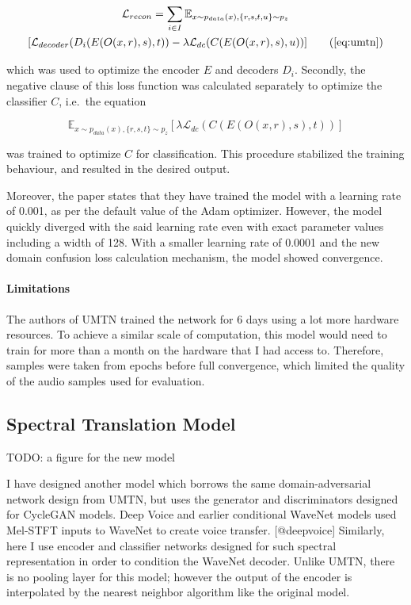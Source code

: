 \documentclass[12pt,a4paper,]{report}
\begin{document}
\begin{multline}
    \mathcal{L}_{recon} = \sum_{i \in I} \mathbb{E}_{x \sim p_{data}(x), \{r, s, t, u\} \sim p_{z}} \\
    [\mathcal{L}_{decoder}(D_i(E(O(x, r), s), t))  - \lambda \mathcal{L}_{dc}(C(E(O(x, r), s), u))] \tag{\ref{eq:umtn}}
\end{multline}

which was used to optimize the encoder \(E\) and decoders \(D_i\).
Secondly, the negative clause of this loss function was calculated
separately to optimize the classifier \(C\), i.e.~the equation

\begin{equation}
    \mathbb{E}_{x \sim p_{data}(x), \{r, s, t\} \sim p_{z}} [\lambda \mathcal{L}_{dc}(C(E(O(x, r), s), t))] \label{eq:dcloss}
\end{equation}

was trained to optimize \(C\) for classification. This procedure
stabilized the training behaviour, and resulted in the desired output.

Moreover, the paper states that they have trained the model with a
learning rate of 0.001, as per the default value of the Adam optimizer.
However, the model quickly diverged with the said learning rate even
with exact parameter values including a width of 128. With a smaller
learning rate of 0.0001 and the new domain confusion loss calculation
mechanism, the model showed convergence.

\paragraph{Limitations \label{limitations}}

The authors of UMTN trained the network for 6 days using a lot more
hardware resources. To achieve a similar scale of computation, this
model would need to train for more than a month on the hardware that I
had access to. Therefore, samples were taken from epochs before full
convergence, which limited the quality of the audio samples used for
evaluation.

\hypertarget{spectral-translation-model}{%
\subsection{Spectral Translation
Model}\label{spectral-translation-model}}

TODO: a figure for the new model

I have designed another model which borrows the same domain-adversarial
network design from UMTN, but uses the generator and discriminators
designed for CycleGAN models. Deep Voice and earlier conditional WaveNet
models used Mel-STFT inputs to WaveNet to create voice transfer.
{[}@deepvoice{]} Similarly, here I use encoder and classifier networks
designed for such spectral representation in order to condition the
WaveNet decoder. Unlike UMTN, there is no pooling layer for this model;
however the output of the encoder is interpolated by the nearest
neighbor algorithm like the original model.
\end{document}
